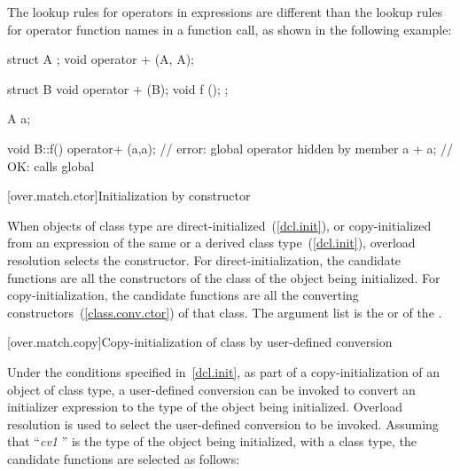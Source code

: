 \pnum
\enternote
The lookup rules for operators in expressions are different than
the lookup
rules for operator function names in a function call, as shown in the following
example:

\begin{codeblock}
struct A { };
void operator + (A, A);

struct B {
  void operator + (B);
  void f ();
};

A a;

void B::f() {
  operator+ (a,a);              // error: global operator hidden by member
  a + a;                        // OK: calls global 
}
\end{codeblock}
\exitnote

[over.match.ctor]{Initialization by constructor}%

\pnum
When objects of class type are direct-initialized~(\ref{dcl.init}),
or copy-initialized from an expression of the same or a
derived class type~(\ref{dcl.init}),
overload
resolution selects the constructor.
For direct-initialization, the
candidate functions are
all the constructors of the class of the object being
initialized.
For copy-initialization, the candidate functions are all
the converting constructors~(\ref{class.conv.ctor}) of that
class.
The argument list is the
 or 
of the .

[over.match.copy]{Copy-initialization of class by user-defined conversion}%

\pnum
Under the conditions specified in~\ref{dcl.init}, as
part of a copy-initialization of an object of class type, a user-defined
conversion can be invoked to convert an initializer expression to the
type of the object being initialized.
Overload resolution is used
to select the user-defined conversion to be invoked.
Assuming that
``\textit{cv1} '' is the type of the object being initialized, with
a class type,
the candidate functions are selected as follows:

